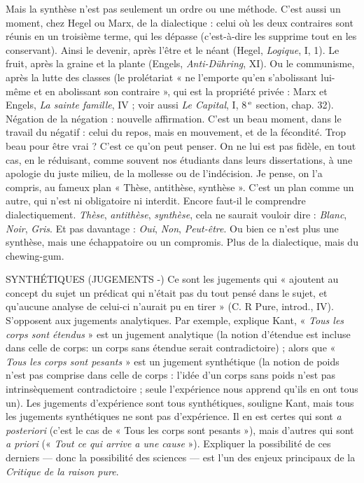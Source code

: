 Mais la synthèse n’est pas seulement un ordre ou une méthode. C’est
aussi un moment, chez Hegel ou Marx, de la dialectique : celui où les deux
contraires sont réunis en un troisième terme, qui les dépasse (c’est-à-dire les
supprime tout en les conservant). Ainsi le devenir, après l’être et le néant
(Hegel, {\it Logique}, I, 1). Le fruit, après la graine et la plante (Engels,
{\it Anti-Dühring}, XI). Ou le communisme, après la lutte des classes (le prolétariat « ne
l'emporte qu’en s’abolissant lui-même et en abolissant son contraire », qui est
la propriété privée : Marx et Engels, {\it La sainte famille}, IV ; voir aussi {\it Le Capital},
I, 8$^\text{\,e}$ section, chap. 32). Négation de la négation : nouvelle affirmation. C’est
un beau moment, dans le travail du négatif : celui du repos, mais en mouvement,
et de la fécondité. Trop beau pour être vrai ? C’est ce qu’on peut penser.
On ne lui est pas fidèle, en tout cas, en le réduisant, comme souvent nos étudiants
dans leurs dissertations, à une apologie du juste milieu, de la mollesse ou
de l’indécision. Je pense, on l’a compris, au fameux plan « Thèse, antithèse,
synthèse ». C’est un plan comme un autre, qui n’est ni obligatoire ni interdit.
Encore faut-il le comprendre dialectiquement. {\it Thèse}, {\it antithèse}, {\it synthèse}, cela ne
saurait vouloir dire : {\it Blanc}, {\it Noir}, {\it Gris}. Et pas davantage : {\it Oui}, {\it Non}, {\it Peut-être}.
Ou bien ce n’est plus une synthèse, mais une échappatoire ou un compromis.
Plus de la dialectique, mais du chewing-gum.

SYNTHÉTIQUES (JUGEMENTS -) Ce sont les jugements qui « ajoutent
au concept du sujet un prédicat qui
n'était pas du tout pensé dans le sujet, et qu'aucune analyse de celui-ci n'aurait
pu en tirer » (C. R Pure, introd., IV). S’opposent aux jugements analytiques.
Par exemple, explique Kant, « {\it Tous les corps sont étendus} » est un jugement analytique
(la notion d’étendue est incluse dans celle de corps: un corps sans
étendue serait contradictoire) ; alors que « {\it Tous les corps sont pesants} » est un
jugement synthétique (la notion de poids n’est pas comprise dans celle de
corps : l’idée d’un corps sans poids n’est pas intrinsèquement contradictoire ;
seule l’expérience nous apprend qu’ils en ont tous un). Les jugements d’expérience
sont tous synthétiques, souligne Kant, mais tous les jugements synthétiques
ne sont pas d'expérience. Il en est certes qui sont {\it a posteriori} (c’est le cas
de « Tous les corps sont pesants »), mais d’autres qui sont {\it a priori} (« {\it Tout ce qui
arrive a une cause} »). Expliquer la possibilité de ces derniers — donc la possibilité
des sciences — est l’un des enjeux principaux de la {\it Critique de la raison pure}.

